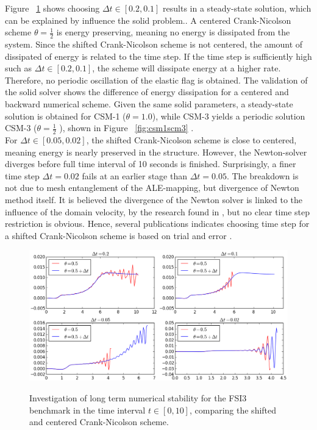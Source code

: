 Figure ~\ref{fig:cncomp1} shows choosing $\Delta t \in [0.2, 0.1]$ results in a steady-state solution, which can be explained by influence the solid problem.. A centered Crank-Nicolson scheme $\theta= \frac{1}{2}$ is energy preserving, meaning no energy is dissipated from the system. Since the shifted Crank-Nicolson scheme is not centered, the amount of dissipated of energy is related to the time step. If the time step is sufficiently high such as $\Delta t \in [0.2, 0.1]$, the scheme will dissipate energy at a higher rate. Therefore, no periodic oscillation of the elastic flag is obtained. The validation of the solid solver shows the difference of energy dissipation for a centered and backward numerical scheme. Given the same solid parameters, a steady-state solution is obtained for CSM-1 ($\theta = 1.0 $), while CSM-3 yields a periodic solution CSM-3 ($\theta = \frac{1}{2}$ ), shown in Figure ~\ref{fig:csm1scm3} .\\

For $\Delta t \in [0.05, 0.02]$, the shifted Crank-Nicolson scheme is close to centered, meaning energy is nearly preserved in the structure. However, the Newton-solver diverges before full time interval of 10 seconds is finished. Surprisingly, a finer time step $\Delta t = 0.02$ fails at an earlier stage than $\Delta t = 0.05$. The breakdown is not due to mesh entanglement of the ALE-mapping, but divergence of Newton method itself\cite{Richter2015}. It is believed the divergence of the Newton solver is linked to the influence of the domain velocity, by the research found in \cite{Formaggia2004}, but no clear time step restriction is obvious. Hence, several publications indicates choosing time step for a shifted Crank-Nicolson scheme is based on trial and error \cite{Wicka, Wick2013a}. 

\begin{figure}[h!]
 	\centering
    \includegraphics[scale=0.6]{./Fig/thetacheck.png} \\
      \caption{Investigation of long term numerical stability for the FSI3 benchmark in the time interval $t \in [0, 10]$, comparing the shifted and centered Crank-Nicolson scheme. }
\label{fig:cncomp1}
\end{figure}

